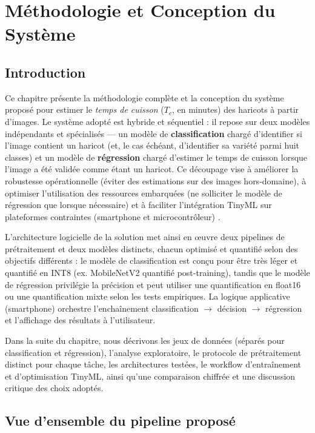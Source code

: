 \chapter{Méthodologie et Conception du Système}
\label{chap:methodologie}

\section{Introduction}

Ce chapitre présente la méthodologie complète et la conception du système proposé pour estimer le \emph{temps de cuisson} (\(T_c\), en minutes) des haricots à partir d'images. Le système adopté est hybride et séquentiel : il repose sur deux modèles indépendants et spécialisés — un modèle de \textbf{classification} chargé d'identifier si l'image contient un haricot (et, le cas échéant, d'identifier sa variété parmi huit classes) et un modèle de \textbf{régression} chargé d'estimer le temps de cuisson lorsque l'image a été validée comme étant un haricot. Ce découpage vise à améliorer la robustesse opérationnelle (éviter des estimations sur des images hors-domaine), à optimiser l'utilisation des ressources embarquées (ne solliciter le modèle de régression que lorsque nécessaire) et à faciliter l'intégration TinyML sur plateformes contraintes (smartphone et microcontrôleur) \cite{warden2019,alirezazadeh2022cascade}.

L'architecture logicielle de la solution met ainsi en œuvre deux pipelines de prétraitement et deux modèles distincts, chacun optimisé et quantifié selon des objectifs différents : le modèle de classification est conçu pour être très léger et quantifié en INT8 (ex. MobileNetV2 quantifié post-training), tandis que le modèle de régression privilégie la précision et peut utiliser une quantification en float16 ou une quantification mixte selon les tests empiriques. La logique applicative (smartphone) orchestre l'enchaînement classification $\rightarrow$ décision $\rightarrow$ régression et l'affichage des résultats à l'utilisateur.

Dans la suite du chapitre, nous décrivons les jeux de données (séparés pour classification et régression), l'analyse exploratoire, le protocole de prétraitement distinct pour chaque tâche, les architectures testées, le workflow d'entraînement et d'optimisation TinyML, ainsi qu'une comparaison chiffrée et une discussion critique des choix adoptés.

\section{Vue d'ensemble du pipeline proposé}

